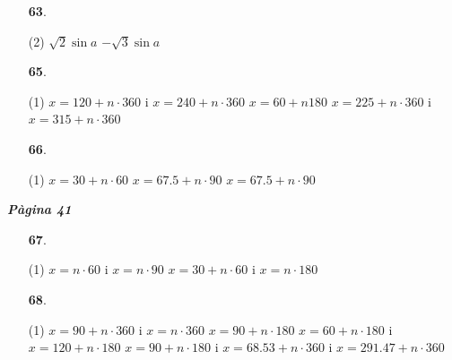 \documentclass[a4paper, pdf, twoside]{book}
\begin{document}
\begin{multicols}{2}
\begin{enumerate}

 \item[\fontfamily{phv}\selectfont\color{blue}\textbf{63}. ] 
 \begin{tasks}[column-sep=1em, item-indent=1.3333em](2)
	 \task $\sqrt {2}\sin a$
	 \task $-\sqrt {3}\sin a$
\end{tasks}
\vspace{0.25cm}



 \item[\fontfamily{phv}\selectfont\color{blue}\textbf{65}. ] 
 \begin{tasks}[column-sep=1em, item-indent=1.3333em](1)
	 \task* $x=120+n\cdot 360$ i $x=240+n\cdot 360$
	 \task $x=60+n 180$
	 \task* $x=225+n\cdot 360$ i $x=315+n\cdot 360$
\end{tasks}
\vspace{0.25cm}



 \item[\fontfamily{phv}\selectfont\color{blue}\textbf{66}. ] 
 \begin{tasks}[column-sep=1em, item-indent=1.3333em](1)
	 \task $x=30+n\cdot 60$
	 \task $x=67.5+n\cdot 90$
	 \task $x=67.5+n\cdot 90$
\end{tasks}
 \end{enumerate}
\vspace{0.3cm}


{\textbf{\em Pàgina 41}} \hrulefill
\begin{enumerate}
\vspace{0.25cm}



 \item[\fontfamily{phv}\selectfont\color{blue}\textbf{67}. ] 
 \begin{tasks}[column-sep=1em, item-indent=1.3333em](1)
	 \task $x=n\cdot 60$ i $x=n\cdot 90$
	 \task* $x=30+n\cdot 60$ i $x=n\cdot 180$
\end{tasks}
 \end{enumerate}
\begin{enumerate}
\vspace{0.25cm}



 \item[\fontfamily{phv}\selectfont\color{blue}\textbf{68}. ] 
 \begin{tasks}[column-sep=1em, item-indent=1.3333em](1)
	 \task* $x=90+n\cdot 360$ i $x=n\cdot 360$
	 \task $x=90+n\cdot 180$
	 \task* $x=60+n\cdot 180$ i $x=120+n\cdot 180$
	 \task* $x=90+n\cdot 180$ i $x=68.53+n\cdot 360$ i $x=291.47+n\cdot 360$
\end{tasks}
\vspace{0.25cm}



\end{enumerate}
\end{multicols}
\end{document}
